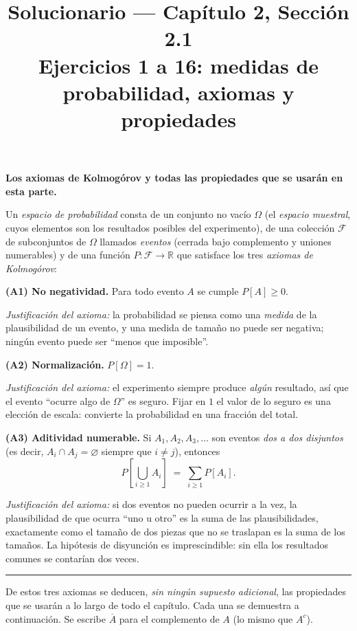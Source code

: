 \documentclass[11pt]{article}
\title{Solucionario --- Cap\'itulo 2, Secci\'on 2.1\\ Ejercicios 1 a 16: medidas de probabilidad, axiomas y propiedades}
\author{}
\date{}
\begin{document}
\maketitle

\begin{teo}
\textbf{Los axiomas de Kolmogórov y todas las propiedades que se usarán en esta parte.}

Un \emph{espacio de probabilidad} consta de un conjunto no vacío $\Omega$ (el \emph{espacio
muestral}, cuyos elementos son los resultados posibles del experimento), de una colección
$\mathcal{F}$ de subconjuntos de $\Omega$ llamados \emph{eventos} (cerrada bajo complemento y
uniones numerables) y de una función $P:\mathcal{F}\to\mathbb{R}$ que satisface los tres
\emph{axiomas de Kolmogórov}:

\medskip
\textbf{(A1) No negatividad.} Para todo evento $A$ se cumple $P[A]\ge 0$.

\emph{Justificación del axioma:} la probabilidad se piensa como una \emph{medida} de la
plausibilidad de un evento, y una medida de tamaño no puede ser negativa; ningún evento puede
ser ``menos que imposible''.

\medskip
\textbf{(A2) Normalización.} $P[\Omega]=1$.

\emph{Justificación del axioma:} el experimento siempre produce \emph{algún} resultado, así que
el evento ``ocurre algo de $\Omega$'' es seguro. Fijar en $1$ el valor de lo seguro es una
elección de escala: convierte la probabilidad en una fracción del total.

\medskip
\textbf{(A3) Aditividad numerable.} Si $A_1,A_2,A_3,\dots$ son eventos \emph{dos a dos
disjuntos} (es decir, $A_i\cap A_j=\varnothing$ siempre que $i\ne j$), entonces
\[
P\!\left[\bigcup_{i\ge 1}A_i\right] \;=\; \sum_{i\ge 1}P[A_i].
\]

\emph{Justificación del axioma:} si dos eventos no pueden ocurrir a la vez, la plausibilidad de
que ocurra ``uno u otro'' es la suma de las plausibilidades, exactamente como el tamaño de dos
piezas que no se traslapan es la suma de los tamaños. La hipótesis de disyunción es
imprescindible: sin ella los resultados comunes se contarían dos veces.

\medskip\hrule\medskip
De estos tres axiomas se deducen, \emph{sin ningún supuesto adicional}, las propiedades que se
usarán a lo largo de todo el capítulo. Cada una se demuestra a continuación. Se escribe
$\overline{A}$ para el complemento de $A$ (lo mismo que $A^{c}$).


\end{teo}
\end{document}

